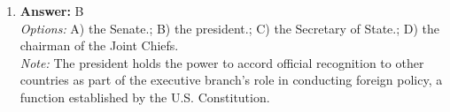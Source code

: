 \documentclass[12pt]{article}
\begin{document}
\begin{enumerate}[label=\arabic*.]
\\ \textit{Note:} The Cold War context led the United States to interpret events in the Third World primarily through a geopolitical lens, viewing local developments as either aligning with or opposing the interests of the capitalist West versus the communist East, thus influencing foreign policy and perceptions of those regions.
\item \textbf{Answer:} B
\\ \textit{Options:} A) the Senate.; B) the president.; C) the Secretary of State.; D) the chairman of the Joint Chiefs.
\\ \textit{Note:} The president holds the power to accord official recognition to other countries as part of the executive branch's role in conducting foreign policy, a function established by the U.S. Constitution.
\end{enumerate}
\end{document}
